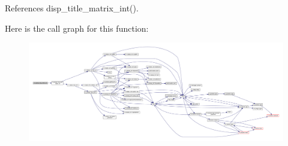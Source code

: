 References disp\+\_\+title\+\_\+matrix\+\_\+int().

Here is the call graph for this function\+:
\nopagebreak
\begin{figure}[H]
\begin{center}
\leavevmode
\includegraphics[width=350pt]{namespacem__display_a00d35e9c84ad3f0238e4598f09f79961_cgraph}
\end{center}
\end{figure}
\mbox{\label{namespacem__display_a12b5831082d636bdab23dbc7c1ddb879}} 
